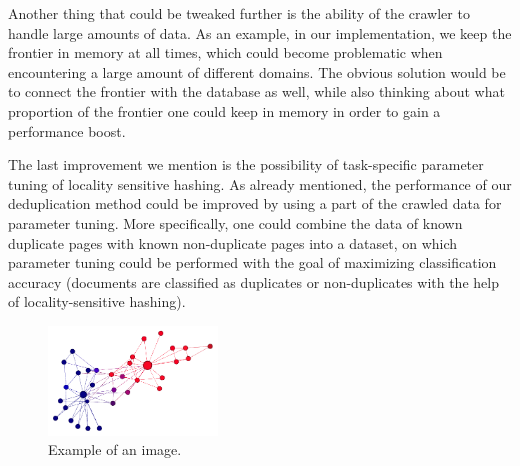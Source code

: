 \documentclass[9pt]{IEEEtran}
\begin{document}
Another thing that could be tweaked further is the ability of the crawler to handle large amounts of data.
As an example, in our implementation, we keep the frontier in memory at all times, which could become problematic when encountering a large amount of different domains.
The obvious solution would be to connect the frontier with the database as well, while also thinking about what proportion of the frontier one could keep in memory in order to gain a performance boost.

The last improvement we mention is the possibility of task-specific parameter tuning of locality sensitive hashing.
As already mentioned, the performance of our deduplication method could be improved by using a part of the crawled data for parameter tuning.
More specifically, one could combine the data of known duplicate pages with known non-duplicate pages into a dataset, on which parameter tuning could be performed with the goal of maximizing classification accuracy (documents are classified as duplicates or non-duplicates with the help of locality-sensitive hashing).

\begin{figure}[h] \centering
    \includegraphics[width=0.4\textwidth]{karate.png}
    \caption{{Example of an image.}}
    \label{fig:karate}
\end{figure}


 






\end{document}
